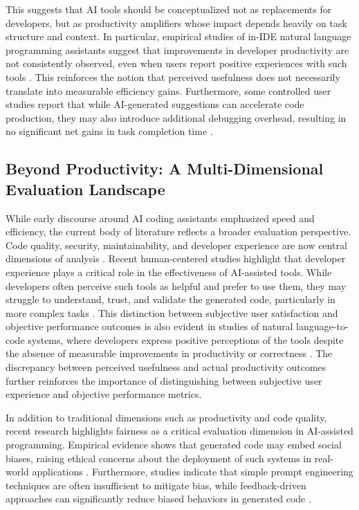 \documentclass[conference]{IEEEtran}
\begin{document}
This suggests that AI tools should be conceptualized not as replacements for developers, but as productivity amplifiers whose impact depends heavily on task structure and context. In particular, empirical studies of in-IDE natural language programming assistants suggest that improvements in developer productivity are not consistently observed, even when users report positive experiences with such tools \cite{xu2022nl2code}. This reinforces the notion that perceived usefulness does not necessarily translate into measurable efficiency gains. Furthermore, some controlled user studies report that while AI-generated suggestions can accelerate code production, they may also introduce additional debugging overhead, resulting in no significant net gains in task completion time \cite{vaithilingam2022usability}.

\subsection{Beyond Productivity: A Multi-Dimensional Evaluation Landscape}

While early discourse around AI coding assistants emphasized speed and efficiency, the current body of literature reflects a broader evaluation perspective. Code quality, security, maintainability, and developer experience are now central dimensions of analysis \cite{yetistiren2023evaluation}. Recent human-centered studies highlight that developer experience plays a critical role in the effectiveness of AI-assisted tools. While developers often perceive such tools as helpful and prefer to use them, they may struggle to understand, trust, and validate the generated code, particularly in more complex tasks \cite{vaithilingam2022usability}. This distinction between subjective user satisfaction and objective performance outcomes is also evident in studies of natural language-to-code systems, where developers express positive perceptions of the tools despite the absence of measurable improvements in productivity or correctness \cite{xu2022nl2code}. The discrepancy between perceived usefulness and actual productivity outcomes further reinforces the importance of distinguishing between subjective user experience and objective performance metrics.

In addition to traditional dimensions such as productivity and code quality, recent research highlights fairness as a critical evaluation dimension in AI-assisted programming. Empirical evidence shows that generated code may embed social biases, raising ethical concerns about the deployment of such systems in real-world applications \cite{huang2025bias}. Furthermore, studies indicate that simple prompt engineering techniques are often insufficient to mitigate bias, while feedback-driven approaches can significantly reduce biased behaviors in generated code \cite{huang2025bias}.
\end{document}
